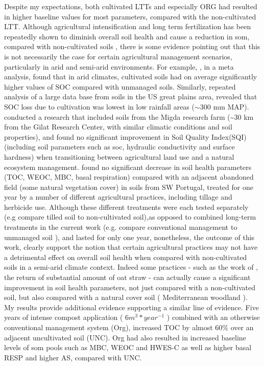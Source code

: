	Despite my expectations, both cultivated LTTs and especially ORG had resulted in higher baseline values for most parameters, compared with the non-cultivated LTT. Although agricultural intensification and long term fertilization has been repeatedly shown to diminish overall soil health and cause a reduction in \gls{som}, compared with non-cultivated soils \citep{laurance2014, mganga2016, tilman2011}, there is some evidence pointing out that this is not necessarily the case for certain agricultural management scenarios, particularly in arid and semi-arid environments.  For example, \citet{trivedi2016}, in a meta analysis, found that in arid climates, cultivated soils had on average significantly higher values of SOC compared with unmanaged soils. Similarly, repeated analysis of a large data base from soils in the US great plains area, revealed that SOC loss due to cultivation was lowest in low rainfall areas ($ \sim $300 mm MAP)\citep{miller2004, burke1989}. \citet{paz-kagan2014} conducted a research that included soils from the Migda research farm (\~{}30 km from the Gilat Research Center, with similar climatic conditions and soil properties), and found no significant improvement in Soil Quality Index(SQI) (including soil parameters such as \gls{soc}, hydraulic conductivity and surface hardness) when transitioning between agricultural land use and a natural ecosystem management. \citet{garcia-orenes2010} found no significant decrease in soil health parameters (TOC, WEOC, MBC, basal respiration) compared with an adjacent abandoned field (some natural vegetation cover) in soils from SW Portugal, treated for one year by  a number of different agricultural practices, including tillage and herbicide use. Although these different treatments were each tested separately (e.g compare tilled soil to non-cultivated soil),as opposed to combined long-term treatments in the current work (e.g. compare conventional management to unmanaged soil ), and lasted for only one year, nonetheless, the outcome of this work, clearly support the notion that certain agricultural practices may not have a detrimental effect on overall soil health when compared with non-cultivated soils in a semi-arid climate context. Indeed some practices - such as the work of \citeauthor{garcia-orenes2010}, the return of substantial amount of oat straw - can actually cause a significant improvement in soil health parameters, not just compared with a non-cultivated soil, but also compared with a natural cover soil ( Mediterranean woodland ).\\
	My results provide additional evidence supporting a similar line of evidence. Five years of intense compost application ( $ 6 m^3*year^{-1} $ ) combined with an otherwise conventional management system (Org), increased TOC by almost 60\% over an adjacent uncultivated soil (UNC). Org had also resulted in increased baseline levels of \gls{som} pools such as MBC, WEOC  and HWES-C  as well as higher basal RESP and higher AS, compared with UNC. \\
